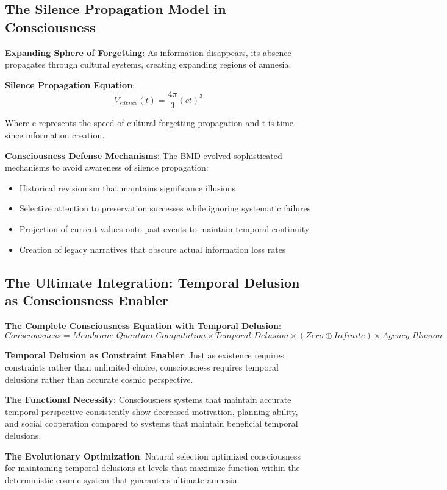 \documentclass[12pt]{article}
\begin{document}
{\subsection{The Silence Propagation Model in Consciousness}

\textbf{Expanding Sphere of Forgetting}: As information disappears, its absence propagates through cultural systems, creating expanding regions of amnesia.

\textbf{Silence Propagation Equation}:
$$V_{silence}(t) = \frac{4\pi}{3}(ct)^3$$

Where c represents the speed of cultural forgetting propagation and t is time since information creation.

\textbf{Consciousness Defense Mechanisms}: The BMD evolved sophisticated mechanisms to avoid awareness of silence propagation:
\begin{itemize}
\item Historical revisionism that maintains significance illusions
\item Selective attention to preservation successes while ignoring systematic failures
\item Projection of current values onto past events to maintain temporal continuity
\item Creation of legacy narratives that obscure actual information loss rates
\end{itemize}

\subsection{The Ultimate Integration: Temporal Delusion as Consciousness Enabler}

\textbf{The Complete Consciousness Equation with Temporal Delusion}:
$$Consciousness = Membrane\_Quantum\_Computation \times Temporal\_Delusion \times (Zero \oplus Infinite) \times Agency\_Illusion$$

\textbf{Temporal Delusion as Constraint Enabler}: Just as existence requires constraints rather than unlimited choice, consciousness requires temporal delusions rather than accurate cosmic perspective.

\textbf{The Functional Necessity}: Consciousness systems that maintain accurate temporal perspective consistently show decreased motivation, planning ability, and social cooperation compared to systems that maintain beneficial temporal delusions.

\textbf{The Evolutionary Optimization}: Natural selection optimized consciousness for maintaining temporal delusions at levels that maximize function within the deterministic cosmic system that guarantees ultimate amnesia.

}
\end{document}
